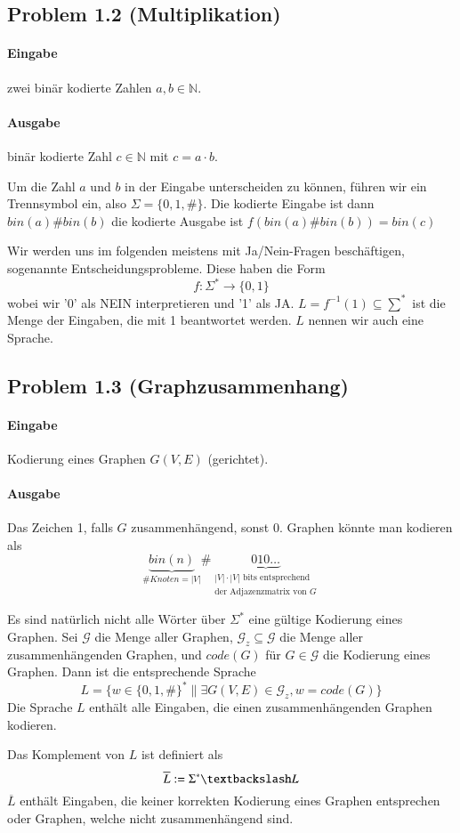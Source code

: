 \subsection*{Problem 1.2 (Multiplikation)}
\paragraph*{Eingabe} zwei binär kodierte Zahlen $a,b \in \mathbb{N}$.
\paragraph*{Ausgabe} binär kodierte Zahl $c \in \mathbb{N}$ mit $c=a \cdot b$.

\par\medskip
Um die Zahl $a$ und $b$ in der Eingabe unterscheiden zu können, führen wir ein Trennsymbol ein, also $\Sigma = \{ 0,1,\# \}$. Die kodierte Eingabe ist dann $bin(a)\#bin(b)$ die kodierte Ausgabe ist $f(bin(a)\#bin(b))=bin(c)$
\par\bigskip
Wir werden uns im folgenden meistens mit Ja/Nein-Fragen beschäftigen, sogenannte Entscheidungsprobleme. Diese haben die Form $$ f:\Sigma^* \rightarrow \{ 0,1 \} $$ wobei wir '0' als NEIN interpretieren und '1' als JA. $ L=f^{-1}(1) \subseteq \sum^* $ ist die Menge der Eingaben, die mit 1 beantwortet werden. $L$ nennen wir auch eine Sprache.
\par\medskip

\subsection*{Problem 1.3 (Graphzusammenhang)}
\paragraph*{Eingabe} Kodierung eines Graphen $G(V,E)$ (gerichtet).
\paragraph*{Ausgabe} Das Zeichen 1, falls $G$ zusammenhängend, sonst 0. Graphen könnte man kodieren als $$ \underbrace{bin(n)}_{\# Knoten = |V|}\# \underbrace{010 \dots}_{\substack{|V| \cdot |V| \text{ bits entsprechend} \\ \text{der Adjazenzmatrix von } G} } $$ %

\par\medskip
Es sind natürlich nicht alle Wörter über $\Sigma^*$ eine gültige Kodierung eines Graphen. Sei $\mathcal{G}$ die Menge aller Graphen, $\mathcal{G}_z \subseteq \mathcal{G}$ die Menge aller zusammenhängenden Graphen, und $code(G)$ für $G \in \mathcal{G}$ die Kodierung eines Graphen. Dann ist die entsprechende Sprache $$ L=\{ w \in \{ 0,1,\# \}^* \| \exists G(V,E) \in \mathcal{G}_z, w=code(G) \} $$ Die Sprache $L$ enthält alle Eingaben, die einen zusammenhängenden Graphen kodieren.
\par\medskip
Das Komplement von $L$ ist definiert als $$ \overline{L} := \Sigma^* \textbackslash L $$ $\overline{L}$ enthält Eingaben, die keiner korrekten Kodierung eines Graphen entsprechen oder Graphen, welche nicht zusammenhängend sind.


